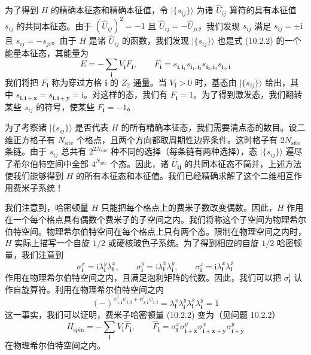 为了得到 $H$ 的精确本征态和精确本征值，令 $|\{s_{ij}\}\rangle$ 为诸 $\hat U_{ij}$ 算符的具有本征值 $s_{ij}$ 的共同本征态。由于 $(\hat U_{ij})^{2}=-1$ 且 $\hat U_{ij}=-\hat U_{ji}$，我们发现 $s_{ij}$ 满足 $s_{ij}=\pm\mathrm{i}$ 且 $s_{ij}=-s_{ji}$。由于 $H$ 是诸 $\hat U_{ij}$ 的函数，我们发现 $|\{s_{ij}\}\rangle$ 也是式 (10.2.2) 的一个能量本征态，其能量为
\begin{equation*}
E=-\sum_{\pmb{i}}V_{\pmb{i}}F_{\pmb{i}},\qquad
F_{\pmb{i}}=s_{\pmb{i},\pmb{i}_1}s_{\pmb{i}_1,\pmb{i}_2}s_{\pmb{i}_2,\pmb{i}_3}s_{\pmb{i}_3,\pmb{i}}
\tag{10.2.4}
\end{equation*}
我们将把 $F_{\pmb{i}}$ 称为穿过方格 $\pmb{i}$ 的 $Z_2$ 通量。当 $V_{\pmb{i}}>0$ 时，基态由 $|\{s_{ij}\}\rangle$ 给出，其中 $s_{\pmb{i},\pmb{i}+\pmb{x}}=s_{\pmb{i},\pmb{i}+\pmb{y}}=\mathrm{i}$。对这样的态，我们有 $F_{\pmb{i}}=1$。为了得到激发态，我们翻转某些 $s_{ij}$ 的符号，使某些 $F_{\pmb{i}}=-1$。

为了考察诸 $|\{s_{ij}\}\rangle$ 是否代表 $H$ 的所有精确本征态，我们需要清点态的数目。设二维正方格子有 $N_{\text{site}}$ 个格点，且两个方向都取周期性边界条件。这时格子有 $2N_{\text{site}}$ 条链。由于 $s_{ij}$ 总共有 $2^{2N_{\text{site}}}$ 种不同的选择（每条链有两种选择），态 $|\{s_{ij}\}\rangle$ 遍尽了希尔伯特空间中全部 $4^{N_{\text{site}}}$ 个态。因此，诸 $\hat U_{\pmb{i}\pmb{j}}$ 的共同本征态不简并，上述方法使我们能够得到 $H$ 的所有本征态和本征值。我们已经精确求解了这个二维相互作用费米子系统！

我们注意到，哈密顿量 $H$ 只能把每个格点上的费米子数改变偶数。因此，$H$ 作用在一个每个格点具有偶数个费米子的子空间之内。我们将称这个子空间为物理希尔伯特空间。物理希尔伯特空间在每个格点上只有两个态。限制在物理空间之内时，$H$ 实际上描写一个自旋 $1/2$ 或硬核玻色子系统。为了得到相应的自旋 $1/2$ 哈密顿量，我们注意到
\begin{equation*}
\sigma_{\pmb{i}}^{x}=\mathrm{i}\lambda_{\pmb{i}}^{y}\lambda_{\pmb{i}}^{x},\qquad
\sigma_{\pmb{i}}^{y}=\mathrm{i}\lambda_{\pmb{i}}^{\bar{x}}\lambda_{\pmb{i}}^{y},\qquad
\sigma_{\pmb{i}}^{z}=\mathrm{i}\lambda_{\pmb{i}}^{x}\lambda_{\pmb{i}}^{\bar{x}}
\tag{10.2.5}
\end{equation*}
作用在物理希尔伯特空间之内，且满足泡利矩阵的代数。因此，我们可以把 $\sigma_{\pmb{i}}^{l}$ 认作自旋算符。利用在物理希尔伯特空间之内
\begin{equation*}
(-)^{\psi^{\dagger}_{1,\pmb{i}}\psi_{1,\pmb{i}}+\psi^{\dagger}_{2,\pmb{i}}\psi_{2,\pmb{i}}}
=\lambda_{\pmb{i}}^{x}\lambda_{\pmb{i}}^{y}\lambda_{\pmb{i}}^{\bar{x}}\lambda_{\pmb{i}}^{\bar{y}}=1
\end{equation*}
这一事实，我们可以证明，费米子哈密顿量 (10.2.2) 变为（见问题 10.2.2）
\begin{equation*}
H_{\text{spin}}=-\sum_{\pmb{i}}V_{\pmb{i}}\hat F_{\pmb{i}},\qquad
\hat F_{\pmb{i}}=\sigma_{\pmb{i}}^{x}\sigma_{\pmb{i}+\hat{\pmb{x}}}^{y}\sigma_{\pmb{i}+\hat{\pmb{x}}+\hat{\pmb{y}}}^{x}\sigma_{\pmb{i}+\hat{\pmb{y}}}^{y}
\tag{10.2.6}
\end{equation*}
在物理希尔伯特空间之内。

